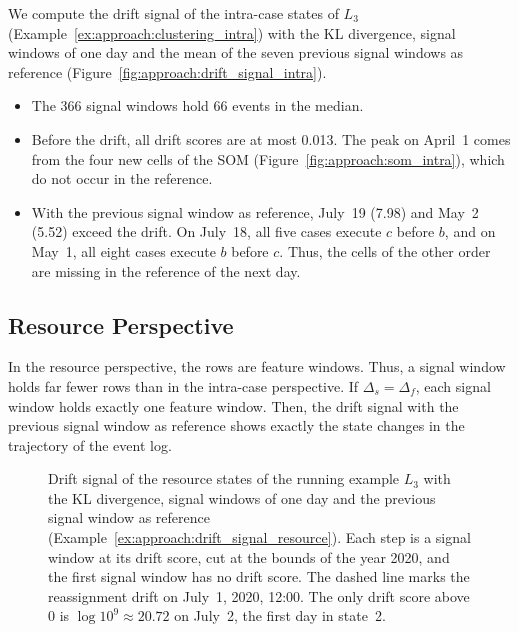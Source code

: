 \begin{example}
	\label{ex:approach:drift_signal_intra}
	We compute the drift signal of the intra-case states of $L_3$ (Example~\ref{ex:approach:clustering_intra}) with the KL divergence, signal windows of one day and the mean of the seven previous signal windows as reference (Figure~\ref{fig:approach:drift_signal_intra}).
	\begin{itemize}
		\item The 366 signal windows hold 66 events in the median.

		\item Before the drift, all drift scores are at most 0.013. The peak on April~1 comes from the four new cells of the SOM (Figure~\ref{fig:approach:som_intra}), which do not occur in the reference.

		\item With the previous signal window as reference, July~19 (7.98) and May~2 (5.52) exceed the drift. On July~18, all five cases execute $c$ before $b$, and on May~1, all eight cases execute $b$ before $c$. Thus, the cells of the other order are missing in the reference of the next day.
	\end{itemize}
\end{example}

\subsection{Resource Perspective}
\label{sec:approach:drift_signals:resource}
In the resource perspective, the rows are feature windows. Thus, a signal window holds far fewer rows than in the intra-case perspective. If $\Delta_s = \Delta_f$, each signal window holds exactly one feature window. Then, the drift signal with the previous signal window as reference shows exactly the state changes in the trajectory of the event log.

\begin{figure}[tb]
	\centering
	
	\caption[Resource drift signal of the running example]{%
		Drift signal of the resource states of the running example $L_3$ with the KL divergence, signal windows of one day and the previous signal window as reference (Example~\ref{ex:approach:drift_signal_resource}). Each step is a signal window at its drift score, cut at the bounds of the year 2020, and the first signal window has no drift score. The dashed line marks the reassignment drift on July~1, 2020, 12:00. The only drift score above 0 is $\log 10^9 \approx 20.72$ on July~2, the first day in state~2.}
	\label{fig:approach:drift_signal_resource}
\end{figure}

